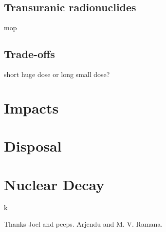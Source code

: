\documentclass[preprint,aip,cha]{revtex4-1}
\begin{document}
    \subsection{Transuranic radionuclides}
    mop
    \subsection{Trade-offs}
    short huge dose or long small dose?

\section{Impacts}

\section{Disposal}


\section{Nuclear Decay}
k
\begin{acknowledgments}
Thanks Joel and peeps. Arjendu and M. V. Ramana.
\end{acknowledgments}

\pagebreak


\end{document}
